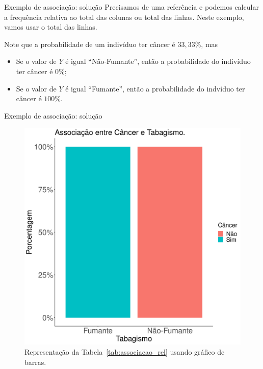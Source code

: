 \documentclass[9pt]{beamer}
\begin{document}
\begin{frame}{Exemplo de associação: solução}
Precisamos de uma referência e podemos calcular a frequência relativa ao total das colunas ou total das linhas. Neste exemplo, vamos usar o total das linhas.
\begin{table}[htbp]
	\centering
	\caption{Tabela de contingência com frequência relativa ao total das linhas.}
	\label{tab:associacao_rel}
\end{table} 

Note que a probabilidade de um indivíduo ter câncer é {\color{red} $33,33\%$}, mas
\begin{itemize}
	\item Se o valor de $Y$ é igual ``Não-Fumante'', então a probabilidade do indivíduo ter câncer é {\color{brown} $0\%$};
	\item Se o valor de $Y$ é igual ``Fumante'', então a probabilidade do indvíduo ter câncer é {\color{blue} $100\%$}.
\end{itemize}

\end{frame}

\begin{frame}{Exemplo de associação: solução}

\begin{figure}[htbp]
	\centering
	\includegraphics[width = 0.6\linewidth]{figures/associacao.png}
	\caption{Representação da Tabela~\ref{tab:associacao_rel} usando gráfico de barras.}
	\label{tab:graph-associacao}
\end{figure}
\end{frame}
\end{document}
